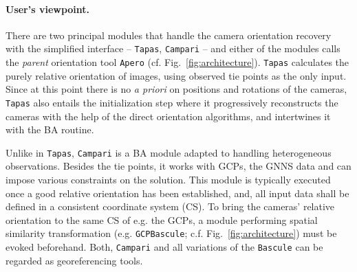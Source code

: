 \documentclass[twocolumn]{bmcart}%
\begin{document}
\paragraph*{User's viewpoint.}
There are two principal modules that handle the camera orientation recovery with the simplified interface -- {\tt Tapas}, {\tt Campari} -- and either of the modules calls the \textit{parent} orientation tool {\tt Apero} (cf. Fig.~\ref{fig:architecture}). {\tt Tapas} calculates the purely relative orientation of images, using observed tie points as the only input. Since at this point there is no \textit{a priori} on positions and rotations of the cameras, {\tt Tapas}  also entails the initialization step where it progressively reconstructs the cameras with the help of the direct orientation algorithms, and intertwines it with the BA routine. \par 
%
Unlike in {\tt Tapas}, {\tt Campari} is a BA module adapted to handling heterogeneous observations. Besides the tie points, it works with GCPs, the GNNS data and can impose various constraints on the solution. This module is typically executed once a good relative orientation has been established, and, all input data shall be defined in a consistent coordinate system (CS). To bring the cameras' relative orientation to the same CS of e.g. the GCPs, a module performing spatial similarity transformation (e.g. {\tt GCPBascule}; c.f. Fig.~\ref{fig:architecture}) must be evoked beforehand. Both, {\tt Campari} and all variations of the  {\tt Bascule} can be regarded as georeferencing tools. 
\end{document}

